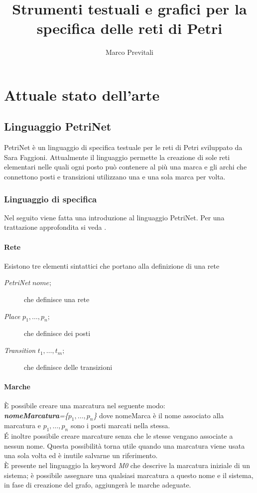 \documentclass[italian,12pt]{book}
\title{Strumenti testuali e grafici per la specifica delle reti di
  Petri}
\author{Marco Previtali}
\date{}
\begin{document}
\maketitle
%
\tableofcontents
%
\chapter{Attuale stato dell'arte}\label{cha:stato_arte}
%
\section{Linguaggio PetriNet}\label{sec:linguaggio_petrinet}
PetriNet è un linguaggio di specifica testuale per le reti di Petri
sviluppato da Sara Faggioni. Attualmente il linguaggio permette la
creazione di sole reti elementari nelle quali ogni posto può contenere
al più una marca e gli archi che connettono posti e transizioni
utilizzano una e una sola marca per volta.
% 
\subsection{Linguaggio di specifica}\label{subsec:componenti_del_linguaggio}
% 
Nel seguito viene fatta una introduzione al linguaggio
PetriNet. Per una trattazione approfondita si veda
\cite{FAG10}.
%
\subsubsection{Rete}
Esistono tre elementi sintattici che portano alla definizione di una rete
\begin{description}
\item[\emph{PetriNet} $nome;$] che definisce una rete
\item[\emph{Place} $p_1, \dots ,p_n;$] che definisce dei
  posti
\item[\emph{Transition} $t_1, \dots ,t_m;$] che definisce
  delle transizioni
\end{description}
% 
\subsubsection{Marche}
\`E possibile creare una marcatura nel seguente modo:\\
\emph{{\bf nomeMarcatura}=\{$p_1,\dots,p_n$\}} dove nomeMarca
  è il nome associato alla marcatura e $p_1,\dots,p_n$
  sono i posti marcati nella stessa.\\
\'E inoltre possibile creare marcature senza che le
stesse vengano associate a nessun nome. Questa
possibilità torna utile quando una marcatura viene usata
una sola volta ed è inutile salvarne un riferimento.\\
\`E presente nel linguaggio la keyword \emph{M0} che descrive la
marcatura iniziale di un sistema; è possibile assegnare
una qualsiasi marcatura a questo nome e il sistema, in
fase di creazione del grafo, aggiungerà le marche
adeguate.
% 
\end{document}
